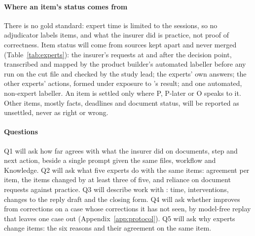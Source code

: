 \paragraph{Where an item's status comes from}
There is no gold standard: expert time is limited to the sessions, so no adjudicator labels items, and what the insurer did is practice, not proof of correctness. Item status will come from sources kept apart and never merged (Table~\ref{tab:experts}): the insurer's requests at and after the decision point, transcribed and mapped by the product builder's automated labeller before any run on the cut file and checked by the study lead; the experts' own answers; the other experts' actions, formed under exposure to \casepath's result; and one automated, non-expert labeller. An item is settled only where P, P-later or O speaks to it. Other items, mostly facts, deadlines and document status, will be reported as unsettled, never as right or wrong.

\paragraph{Questions}
Q1 will ask how far \casepath agrees with what the insurer did on documents, step and next action, beside a single prompt given the same files, workflow and Knowledge. Q2 will ask what five experts do with the same items: agreement per item, the items changed by at least three of five, and reliance on document requests against practice. Q3 will describe work with \casepath: time, interventions, changes to the reply draft and the closing form. Q4 will ask whether \casepath improves from corrections on a case whose corrections it has not seen, by model-free replay that leaves one case out (Appendix~\ref{app:protocol}). Q5 will ask why experts change items: the six reasons and their agreement on the same item.


